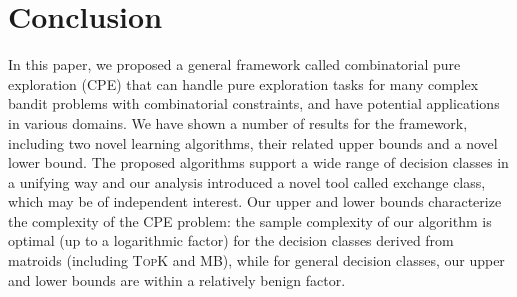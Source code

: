 \documentclass{article}
\newcommand{\Algorithm}{{\small \textsf{CLUCB}}\xspace}
\newcommand{\AlgorithmBud}{{\small \textsf{CSAR}}\xspace}
\newcommand{\Problem}{{CPE}\xspace}
\newcommand{\MultiIdent}{\textsc{TopK}\xspace}
\newcommand{\MultiBandit}{\textsc{MB}\xspace}
\begin{document}
\section{Conclusion}
\vspace{-1em}
In this paper, we proposed a general framework called combinatorial pure exploration (CPE) that
	can handle pure exploration tasks for many complex bandit problems with combinatorial constraints, and
	have potential applications in various domains.
We have shown a number of results for the framework, including two novel learning algorithms, their related upper bounds and a novel lower bound.
The proposed algorithms support a wide range of decision classes in a unifying way and our analysis introduced a novel tool called exchange class, which may be of independent interest.
Our upper and lower bounds characterize the complexity of the \Problem problem: the sample complexity of our algorithm is optimal (up to a logarithmic factor) for the decision classes derived from matroids (including \MultiIdent and \MultiBandit), while for general decision classes, our upper and lower bounds are within a relatively benign factor.





\newpage
{\small


}
\newpage
\appendix
\end{document}
